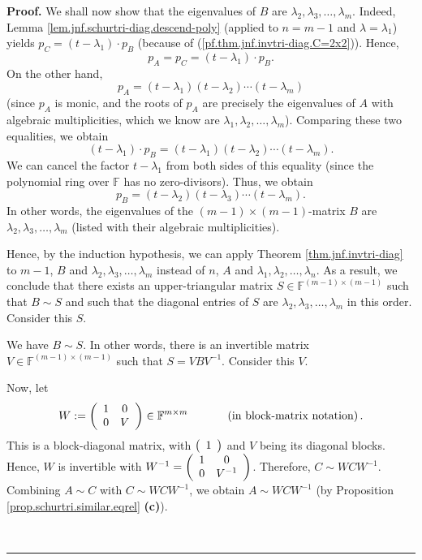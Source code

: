 \documentclass[numbers=enddot,12pt,final,onecolumn,notitlepage]{scrartcl}%
\numberwithin{exer}{subsection}
\theoremstyle{definition}
\newenvironment{proof}[1][Proof]{\noindent\textbf{#1.} }{\ \rule{0.5em}{0.5em}}
\begin{document}
\begin{proof}
We shall now show that the eigenvalues of $B$ are $\lambda_{2},\lambda
_{3},\ldots,\lambda_{m}$. Indeed, Lemma
\ref{lem.jnf.schurtri-diag.descend-poly} (applied to $n=m-1$ and
$\lambda=\lambda_{1}$) yields $p_{C}=\left(  t-\lambda_{1}\right)  \cdot
p_{B}$ (because of (\ref{pf.thm.jnf.invtri-diag.C=2x2})). Hence,%
\[
p_{A}=p_{C}=\left(  t-\lambda_{1}\right)  \cdot p_{B}.
\]
On the other hand,%
\[
p_{A}=\left(  t-\lambda_{1}\right)  \left(  t-\lambda_{2}\right)
\cdots\left(  t-\lambda_{m}\right)
\]
(since $p_{A}$ is monic, and the roots of $p_{A}$ are precisely the
eigenvalues of $A$ with algebraic multiplicities, which we know are
$\lambda_{1},\lambda_{2},\ldots,\lambda_{m}$). Comparing these two equalities,
we obtain%
\[
\left(  t-\lambda_{1}\right)  \cdot p_{B}=\left(  t-\lambda_{1}\right)
\left(  t-\lambda_{2}\right)  \cdots\left(  t-\lambda_{m}\right)  .
\]
We can cancel the factor $t-\lambda_{1}$ from both sides of this equality
(since the polynomial ring over $\mathbb{F}$ has no zero-divisors). Thus, we
obtain%
\[
p_{B}=\left(  t-\lambda_{2}\right)  \left(  t-\lambda_{3}\right)
\cdots\left(  t-\lambda_{m}\right)  .
\]
In other words, the eigenvalues of the $\left(  m-1\right)  \times\left(
m-1\right)  $-matrix $B$ are $\lambda_{2},\lambda_{3},\ldots,\lambda_{m}$
(listed with their algebraic multiplicities).

Hence, by the induction hypothesis, we can apply Theorem
\ref{thm.jnf.invtri-diag} to $m-1$, $B$ and $\lambda_{2},\lambda_{3}%
,\ldots,\lambda_{m}$ instead of $n$, $A$ and $\lambda_{1},\lambda_{2}%
,\ldots,\lambda_{n}$. As a result, we conclude that there exists an
upper-triangular matrix $S\in\mathbb{F}^{\left(  m-1\right)  \times\left(
m-1\right)  }$ such that $B\sim S$ and such that the diagonal entries of $S$
are $\lambda_{2},\lambda_{3},\ldots,\lambda_{m}$ in this order. Consider this
$S$.

We have $B\sim S$. In other words, there is an invertible matrix
$V\in\mathbb{F}^{\left(  m-1\right)  \times\left(  m-1\right)  }$ such that
$S=VBV^{-1}$. Consider this $V$.

Now, let%
\[
W:=\left(
\begin{array}
[c]{cc}%
1 & 0\\
0 & V
\end{array}
\right)  \in\mathbb{F}^{m\times m}\ \ \ \ \ \ \ \ \ \ \left(  \text{in
block-matrix notation}\right)  .
\]
This is a block-diagonal matrix, with $\left(
\begin{array}
[c]{c}%
1
\end{array}
\right)  $ and $V$ being its diagonal blocks. Hence, $W$ is invertible with
$W^{-1}=\left(
\begin{array}
[c]{cc}%
1 & 0\\
0 & V^{-1}%
\end{array}
\right)  $. Therefore, $C\sim WCW^{-1}$. Combining $A\sim C$ with $C\sim
WCW^{-1}$, we obtain $A\sim WCW^{-1}$ (by Proposition
\ref{prop.schurtri.similar.eqrel} \textbf{(c)}).


\end{proof}
\end{document}

